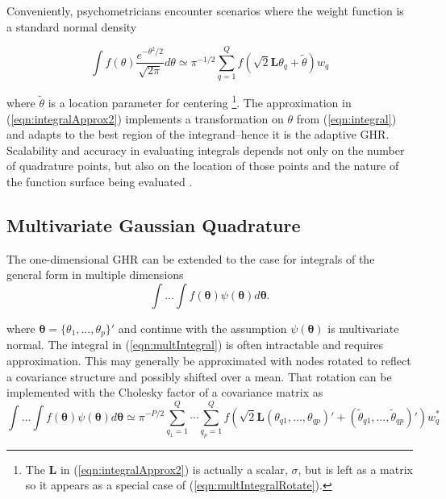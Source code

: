 \documentclass[12pt]{article}
\begin{document}
Conveniently, psychometricians encounter scenarios where the weight function is a standard normal density

\begin{equation}
\label{eqn:integralApprox2}
\int f(\theta)\frac{e^{-\theta^2/2}}{\sqrt{2\pi}} d\theta \simeq \pi^{-1/2}\sum_{q=1}^Q f(\sqrt{2}\bm{L}\theta_q+\widetilde{\theta})w_q
\end{equation}

\noindent where $\widetilde{\theta}$ is a location parameter for centering \cite{liu:pierce}\footnote{The $\bm{L}$ in (\ref{eqn:integralApprox2}) is actually a scalar, $\sigma$, but is left as a matrix so it appears as a special case of (\ref{eqn:multIntegralRotate}).}. The approximation in (\ref{eqn:integralApprox2}) implements a transformation on $\theta$ from (\ref{eqn:integral}) and adapts to the best region of the integrand--hence it is the adaptive GHR. Scalability and accuracy in evaluating integrals depends not only on the number of quadrature points, but also on the location of those points and the nature of the function surface being evaluated \cite{Lesaffre}. 

\subsection*{Multivariate Gaussian Quadrature}

The one-dimensional GHR can be extended to the case for integrals of the general form in multiple dimensions 
\begin{equation}
\label{eqn:multIntegral}
\int \ldots \int f(\bm{\theta}) \psi(\bm{\theta}) d\bm{\theta}.
\end{equation}

\noindent where $\bm{\theta} = \{\theta_{1}, \ldots, \theta_{p}\}'$ and continue with the assumption $\psi(\bm{\theta})$ is multivariate normal. The integral in (\ref{eqn:multIntegral}) is often intractable and requires approximation. This may generally be approximated with nodes rotated to reflect a covariance structure and possibly shifted over a mean. That rotation can be implemented with the Cholesky factor of a covariance matrix as \cite{chowdhary,jackel,judd,stringer} 
\begin{equation}
\label{eqn:multIntegralRotate}
\int \ldots \int f(\bm{\theta})\psi(\bm{\theta}) d\bm{\theta}  \simeq  \pi^{-P/2}\sum_{q_1=1}^{Q} \cdots \sum_{q_p=1}^{Q} f(\sqrt{2}\bm{L}(\theta_{q1}, \ldots, \theta_{qp})' + (\widetilde{\theta}_{q1}, \ldots, \widetilde{\theta}_{qp})')w_q^*
\end{equation}
 
\end{document}
